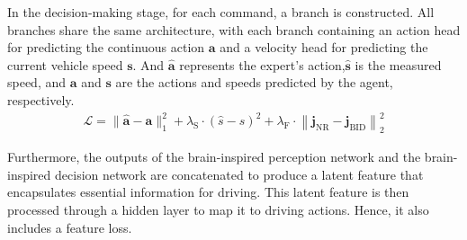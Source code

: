 %

In the decision-making stage, for each command, a branch is constructed. 
All branches share the same architecture, with each branch containing an action head for predicting the continuous action $\mathbf{a}$ and a velocity head for predicting the current vehicle speed $\mathbf{s}$. 
And $\mathbf{\hat{a}}$ represents the expert's action,$\mathbf{\hat{s}}$ is the measured speed, and $\mathbf{a}$ and $\mathbf{s}$ are the actions and speeds predicted by the agent, respectively. 
\begin{align}
   \mathcal{L} = \|\hat{\mathbf{a}}-\mathbf{a}\|_{1}^{2} + \lambda_{\mathrm{S}} \cdot (\hat{s}-s)^{2} + \lambda_{\mathrm{F}} \cdot \left\| \mathbf{j}_{\mathrm{NR}}-\mathbf{j}_{\mathrm{BID}} \right\|_{2}^{2}
\end{align}

Furthermore, the outputs of the brain-inspired perception network and the brain-inspired decision network are concatenated to produce a latent feature that encapsulates essential information for driving. 
This latent feature is then processed through a hidden layer to map it to driving actions. 
Hence, it also includes a feature loss.

